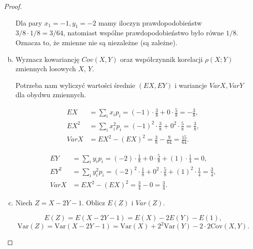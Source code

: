 \documentclass[11pt]{article}
\theoremstyle{definition}
\newcommand{\Var}{\text{Var}}
\newcommand{\Cov}{\text{Cov}}
\begin{document}
\begin{proof}
\begin{enumerate}[a)]
              Dla pary $x_1=-1, y_1=-2$ mamy iloczyn prawdopodobieństw $3/8\cdot1/8=3/64$, natomiast wspólne prawdopodobieństwo było równe $1/8$. Oznacza to, że zmienne nie są niezależne (są zależne).

        \item Wyznacz kowariancję $Cov(X, Y)$ oraz współczynnik korelacji $\rho(X; Y)$ zmiennych losowych $X$, $Y$.

              Potrzeba nam wyliczyć wartości średnie $(EX, EY)$ i wariancje $Var X, Var Y$ dla obydwu zmiennych.

              \begin{align*}
                  EX    & =\sum_ix_ip_i = (-1)\cdot\frac38+0\cdot\frac58=-\frac38,      \\
                  EX^2  & =\sum_ix_i^2p_i = (-1)^2\cdot\frac38+0^2\cdot\frac58=\frac38, \\
                  Var X & =EX^2 - (EX)^2 =\frac38-\frac{9}{64} =\frac{15}{64}.
              \end{align*}

              \begin{align*}
                  EY    & =\sum_iy_ip_i = (-2)\cdot\frac18+0\cdot\frac58+(1)\cdot\frac14=0,               \\
                  EY^2  & =\sum_iy_i^2p_i = (-2)^2\cdot\frac18+0^2\cdot\frac58+(1)^2\cdot\frac14=\frac34, \\
                  Var X & =EX^2 - (EX)^2 =\frac34-0 =\frac{3}{4}.
              \end{align*}

        \item Niech $Z = X - 2Y - 1$. Oblicz $E(Z)$ i $Var(Z)$.

              $$E(Z) = E(X-2Y-1) = E(X) - 2E(Y) - E(1),$$
              $$\Var(Z) = \Var(X-2Y-1) = \Var(X) + 2^2\Var(Y) - 2\cdot2\Cov(X,Y).$$

    \end{enumerate}
\end{proof}
\end{document}
